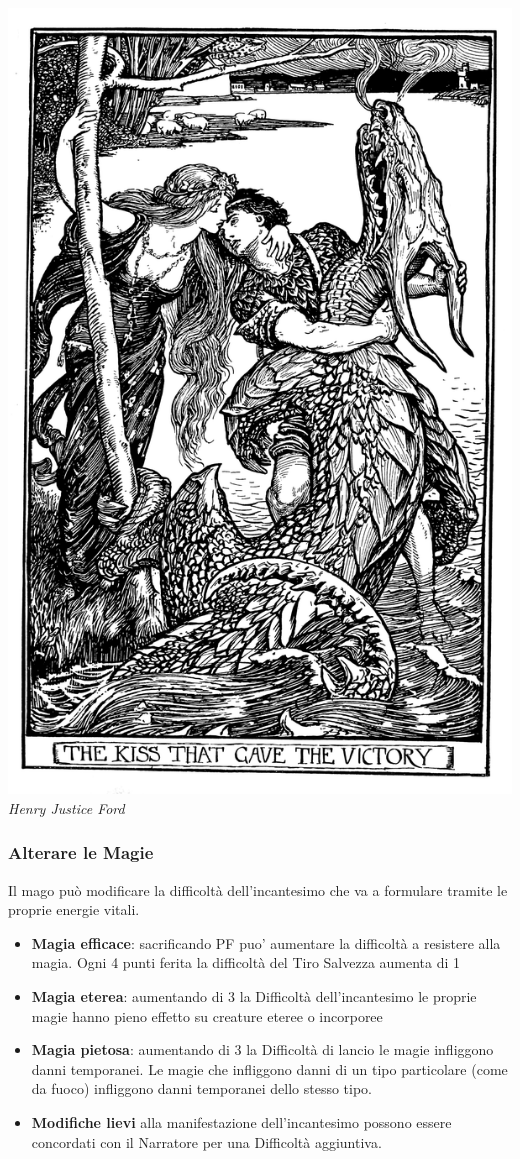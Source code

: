 \begin{multicols}{2}
\begin{center}
	\includegraphics[width=0.9\linewidth]{immagini/bacio.png}
\textit{Henry Justice Ford}
\end{center}


\subsubsection{Alterare le Magie}

Il mago può modificare la difficoltà dell'incantesimo che va a formulare tramite le proprie energie vitali.

\begin{itemize}
	\item
	\textbf{Magia efficace}: sacrificando PF puo' aumentare la difficoltà a resistere alla magia. Ogni 4 punti ferita la difficoltà del Tiro Salvezza aumenta di 1
	\item
	\textbf{Magia eterea}: aumentando di 3 la Difficoltà dell'incantesimo le proprie magie hanno pieno effetto su creature eteree o incorporee
	\item
	\textbf{Magia pietosa}: aumentando di 3 la Difficoltà di lancio le magie infliggono danni temporanei. 
	Le magie che infliggono danni di un tipo particolare (come da fuoco) infliggono danni temporanei dello stesso tipo.
	\item
	\textbf{Modifiche lievi} alla manifestazione dell'incantesimo possono essere concordati con il Narratore per una Difficoltà aggiuntiva. 
\end{itemize}


\end{multicols}
